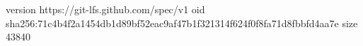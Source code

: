 version https://git-lfs.github.com/spec/v1
oid sha256:71c4b4f2a1454db1d89bf52eac9af47b1f321314f624f0f8fa71d8fbbfd4aa7e
size 43840
